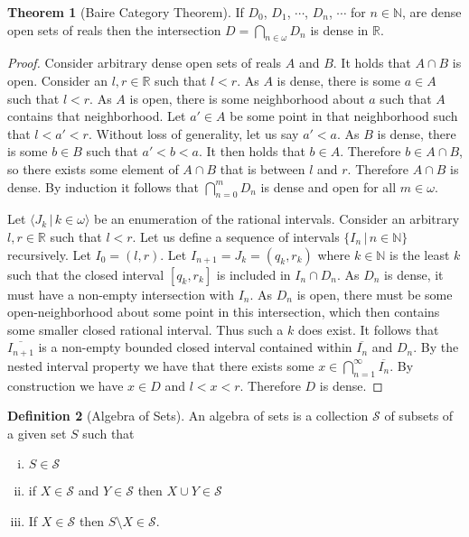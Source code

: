 \documentclass{article}
\theoremstyle{definition}
\newtheorem{thm}{Theorem}[section]
\newtheorem{defn}[thm]{Definition}
\newcommand{\N}{\mathbb{N}}
\newcommand{\R}{\mathbb{R}}
\begin{document}
\begin{thm}[Baire Category Theorem]
    If $D_0$, $D_1$, $\cdots$, $D_n$, $\cdots$ for $n \in \N$, are dense open sets of reals then the intersection $D = \bigcap_{n \in \omega} D_n$ is dense in $\R$.
\end{thm}

\begin{proof}
    Consider arbitrary dense open sets of reals $A$ and $B$. It holds that $A \cap B$ is open. Consider an $l, r \in \R$ such that $l < r$. As $A$ is dense, there is some $a \in A$ such that $l < r$. As $A$ is open, there is some neighborhood about $a$ such that $A$ contains that neighborhood. Let $a' \in A$ be some point in that neighborhood such that $l < a' < r$. Without loss of generality, let us say $a' < a$. As $B$ is dense, there is some $b \in B$ such that $a' < b < a$. It then holds that $b \in A$. Therefore $b \in A \cap B$, so there exists some element of $A \cap B$ that is between $l$ and $r$. Therefore $A \cap B$ is dense. By induction it follows that $\bigcap_{n = 0}^{m} D_n$ is dense and open for all $m \in \omega$.

    Let $\langle J_k \, | \, k \in \omega \rangle$ be an enumeration of the rational intervals. Consider an arbitrary $l, r \in \R$ such that $l < r$. Let us define a sequence of intervals $\{I_n \, | \, n \in \N\}$ recursively. Let $I_0 = (l, r)$. Let $I_{n + 1} = J_k = (q_k, r_k)$ where $k \in \N$ is the least $k$ such that the closed interval $[q_k, r_k]$ is included in $I_n \cap D_n$. As $D_n$ is dense, it must have a non-empty intersection with $I_n$. As $D_n$ is open, there must be some open-neighborhood about some point in this intersection, which then contains some smaller closed rational interval. Thus such a $k$ does exist. It follows that $\overline{I_{n + 1}}$ is a non-empty bounded closed interval contained within $\overline{I_n}$ and $D_n$. By the nested interval property we have that there exists some $x \in \bigcap_{n = 1}^\infty \overline{I_n}$. By construction we have $x \in D$ and $l < x < r$. Therefore $D$ is dense.
\end{proof}

\newpage

\begin{defn}[Algebra of Sets]
    An algebra of sets is a collection $\mathcal{S}$ of subsets of a given set $S$ such that
    \begin{enumerate}[(i)]
        \item $S \in \mathcal{S}$
        \item if $X \in \mathcal{S}$ and $Y \in \mathcal{S}$ then $X \cup Y \in \mathcal{S}$
        \item If $X \in \mathcal{S}$ then $S \setminus X \in \mathcal{S}$.
    \end{enumerate}
\end{defn}
\end{document}
